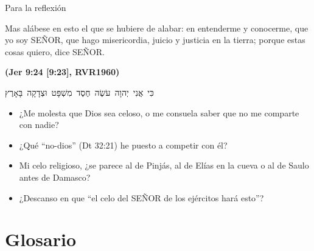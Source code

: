 \documentclass[hyperref={bookmarks=false},aspectratio=169]{beamer}
\newcommand{\heb}[1]{\mbox{\foreignlanguage{hebrew}{#1}}}
\newcommand{\SENOR}{S{\fontsize{0.78em}{1em}\selectfont EÑOR}}
\newcommand{\fuente}[1]{\par\hfill{\upshape\bfseries\footnotesize\textcolor{azul}{#1}}}
\begin{document}
\begin{frame}{Para la reflexión}
\begin{cita}Mas alábese en esto el que se hubiere de alabar: en entenderme y conocerme, que yo soy \SENOR, que hago misericordia, juicio y justicia en la tierra; porque estas cosas quiero, dice \SENOR.\fuente{(Jer 9:24 [9:23], RVR1960)}\end{cita}
\begin{center}\heb{כִּי אֲנִי יְהוָה עֹשֶׂה חֶסֶד מִשְׁפָּט וּצְדָקָה בָּאָרֶץ}\end{center}
\small
\begin{itemize}
\item ¿Me molesta que Dios sea celoso, o me consuela saber que no me comparte con nadie?
\item ¿Qué ``no-dios'' (Dt 32:21) he puesto a competir con él?
\item Mi celo religioso, ¿se parece al de Pinjás, al de Elías en la cueva o al de Saulo antes de Damasco?
\item ¿Descanso en que ``el celo del \SENOR{} de los ejércitos hará esto''?
\end{itemize}
\end{frame}

\section{Glosario}
\end{document}
